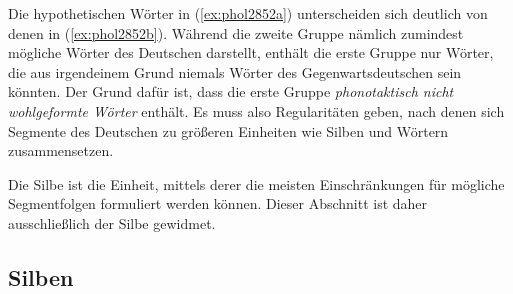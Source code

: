 \begin{exe}
  \ex\label{ex:phol2852}
  \begin{xlist}
  \end{xlist}
\end{exe}

Die hypothetischen Wörter in (\ref{ex:phol2852a}) unterscheiden sich deutlich von denen in (\ref{ex:phol2852b}).
Während die zweite Gruppe nämlich zumindest mögliche Wörter des Deutschen darstellt, enthält die erste Gruppe nur Wörter, die aus irgendeinem Grund niemals Wörter des Gegenwartsdeutschen sein könnten.
Der Grund dafür ist, dass die erste Gruppe \textit{phonotaktisch nicht wohlgeformte Wörter} enthält.
Es muss also Regularitäten geben, nach denen sich Segmente des Deutschen zu größeren Einheiten wie Silben und Wörtern zusammensetzen.


Die Silbe ist die Einheit, mittels derer die meisten Einschränkungen für mögliche Segmentfolgen formuliert werden können.
Dieser Abschnitt ist daher ausschließlich der Silbe gewidmet.

\subsection{Silben}

\label{sec:silben}


